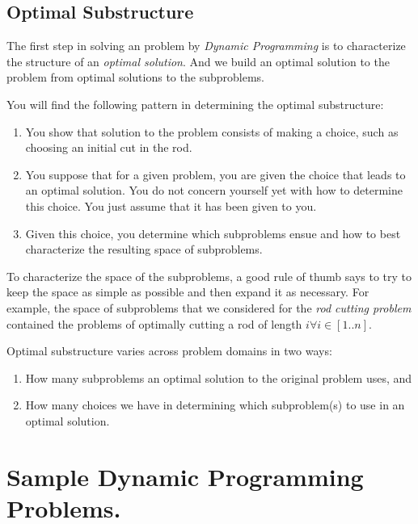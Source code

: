 \documentclass[10pt,a4paper,draft]{article}
\begin{document}
\subsection{Optimal Substructure}
The first step in solving an problem by \emph{Dynamic Programming} is to characterize the structure of an \textit{optimal solution}. And we build an optimal solution to the problem from optimal solutions to the subproblems.\par You will find the following pattern in determining the optimal substructure:
\begin{enumerate}
\item You show that solution to the problem consists of making a choice, such as choosing an initial cut in the rod.
\item You suppose that for a given problem, you are given the choice that leads to an optimal solution. You do not concern yourself yet with how to determine this choice. You just assume that it has been given to you.
\item Given this choice, you determine which subproblems ensue and how to best characterize the resulting space of subproblems.
\end{enumerate}\par
To characterize the space of the subproblems, a good rule of thumb says to try to keep the space as simple as possible and then expand it as necessary. For example, the space of subproblems that we considered for the \emph{rod cutting problem} contained the problems of optimally cutting a rod of length $i \forall i \in [1..n]$.
\par
Optimal substructure varies across problem domains in two ways:
\begin{enumerate}
\item How many subproblems an optimal solution to the original problem uses, and
\item How many choices we have in determining which subproblem(s) to use in an optimal solution.
\end{enumerate}
\section{Sample Dynamic Programming Problems.}
\end{document}

